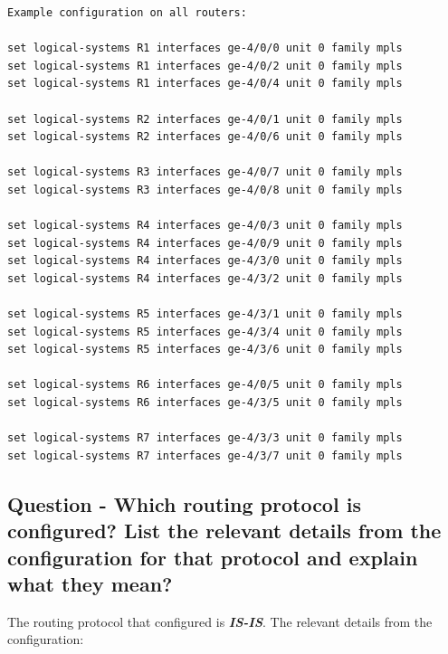 \documentclass[a4paper]{article}
\begin{document}
\begin{verbatim}
Example configuration on all routers:

set logical-systems R1 interfaces ge-4/0/0 unit 0 family mpls
set logical-systems R1 interfaces ge-4/0/2 unit 0 family mpls
set logical-systems R1 interfaces ge-4/0/4 unit 0 family mpls

set logical-systems R2 interfaces ge-4/0/1 unit 0 family mpls
set logical-systems R2 interfaces ge-4/0/6 unit 0 family mpls

set logical-systems R3 interfaces ge-4/0/7 unit 0 family mpls
set logical-systems R3 interfaces ge-4/0/8 unit 0 family mpls

set logical-systems R4 interfaces ge-4/0/3 unit 0 family mpls
set logical-systems R4 interfaces ge-4/0/9 unit 0 family mpls
set logical-systems R4 interfaces ge-4/3/0 unit 0 family mpls
set logical-systems R4 interfaces ge-4/3/2 unit 0 family mpls

set logical-systems R5 interfaces ge-4/3/1 unit 0 family mpls
set logical-systems R5 interfaces ge-4/3/4 unit 0 family mpls
set logical-systems R5 interfaces ge-4/3/6 unit 0 family mpls

set logical-systems R6 interfaces ge-4/0/5 unit 0 family mpls
set logical-systems R6 interfaces ge-4/3/5 unit 0 family mpls

set logical-systems R7 interfaces ge-4/3/3 unit 0 family mpls
set logical-systems R7 interfaces ge-4/3/7 unit 0 family mpls
\end{verbatim}



\subsection{Question - Which routing protocol is configured? List the relevant details from the configuration for that protocol and explain what they mean?}

The routing protocol that configured is \textbf{\textit{IS-IS}}. The relevant details from the configuration:
\end{document}
